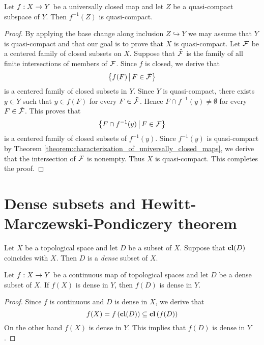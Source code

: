 \begin{proposition}\label{proposition:quasi_compactness_is_preserved_by_preimage_of_universally_closed_maps}
	Let $f:X\rightarrow Y$ be a universally closed map and let $Z$ be a quasi-compact subspace of $Y$. Then $f^{-1}(Z)$ is quasi-compact.
\end{proposition}
\begin{proof}
	By applying the base change along inclusion $Z \hookrightarrow Y$ we may assume that $Y$ is quasi-compact and that our goal is to prove that $X$ is quasi-compact. Let ${\mathcal F}$ be a centered family of closed subsets on $X$. Suppose that $\tilde{{\mathcal F}}$ is the family of all finite intersections of members of ${\mathcal F}$. Since $f$ is closed, we derive that
	$$\big\{f(F)\,\big|\,F\in \tilde{{\mathcal F}}\big\}$$
	is a centered family of closed subsets in $Y$. Since $Y$ is quasi-compact, there exists $y \in Y$ such that $y \in f(F)$ for every $F \in \tilde{{\mathcal F}}$. Hence $F\cap f^{-1}(y) \neq \emptyset$ for every $F \in \tilde{{\mathcal F}}$. This proves that
	$$\big\{F\cap f^{-1}(y)\,\big|\,F\in {\mathcal F}\big\}$$
	is a centered family of closed subsets of $f^{-1}(y)$. Since $f^{-1}(y)$ is quasi-compact by Theorem \ref{theorem:characterization_of_universally_closed_maps}, we derive that the intersection of ${\mathcal F}$ is nonempty. Thus $X$ is quasi-compact. This completes the proof.
\end{proof}

\section{Dense subsets and Hewitt-Marczewski-Pondiczery theorem}

\begin{definition}
	Let $X$ be a topological space and let $D$ be a subset of $X$. Suppose that $\mathbf{cl}(D)$ coincides with $X$. Then $D$ is a \textit{dense} subset of $X$.
\end{definition}

\begin{fact}\label{fact:image_of_a_dense_subset_under_a_continuous_map_with_dense_image_is_dense}
	Let $f:X\rightarrow Y$ be a continuous map of topological spaces and let $D$ be a dense subset of $X$. If $f(X)$ is dense in $Y$, then $f(D)$ is dense in $Y$.
\end{fact}
\begin{proof}
	Since $f$ is continuous and $D$ is dense in $X$, we derive that
	$$f(X) = f\left(\mathbf{cl}(D)\right) \subseteq \mathbf{cl}\left(f(D)\right)$$
	On the other hand $f\left(X\right)$ is dense in $Y$. This implies that $f(D)$ is dense in $Y$.
\end{proof}

